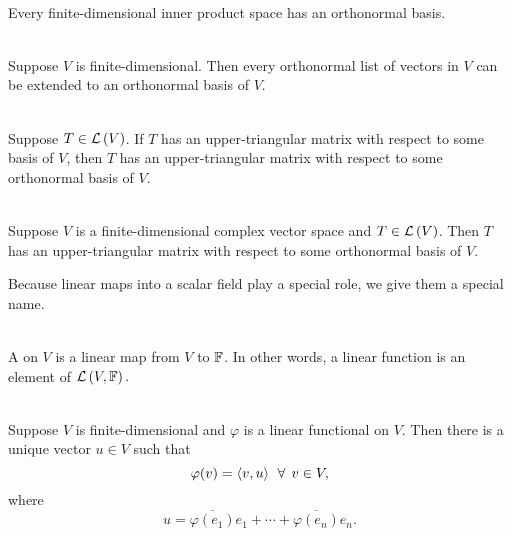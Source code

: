 \\
Every finite-dimensional inner product space has an orthonormal basis.

\\
Suppose $V$ is finite-dimensional. Then every orthonormal list of vectors in $V$ can be extended to an orthonormal basis of $V$. 

\\
Suppose $T \in \mathcal{L}\left({V}\right)$. If $T$ has an upper-triangular matrix with respect to some basis of $V$, then $T$ has an upper-triangular matrix with respect to some orthonormal basis of $V$.

\\
Suppose $V$ is a finite-dimensional complex vector space and $T \in \mathcal{L}\left({V}\right)$. Then $T$ has an upper-triangular matrix with respect to some orthonormal basis of $V$.

\nnl Because linear maps into a scalar field play a special role, we give them a special name.

\\A {} on $V$ is a linear map from $V$ to $\mathbb{F}$. In other words, a linear function is an element of $\mathcal{L}\left({V,\mathbb{F}}\right).$

\\
Suppose $V$ is finite-dimensional and $\varphi$ is a linear functional on $V$. Then there is a unique vector $u \in V$ such that
$$\varphi(v) = \left\langle{v,u}\right\rangle \;\, \forall \;\, v \in V,$$
where
$$u = \overline{\varphi(e_1)}e_1 + \cdots + \overline{\varphi(e_n)}e_n.$$